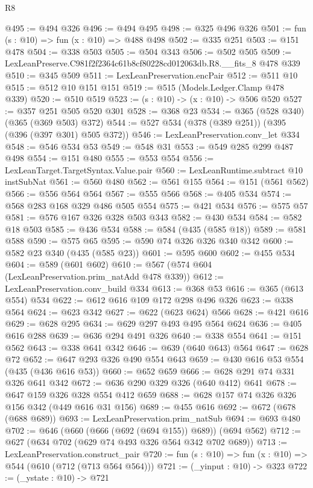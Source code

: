 \begin{lexlean}{R8}
\begin{coremodule}
@495 := @494 @326
@496 := @494 @495
@498 := @325 @496 @326
@501 := fun (s : @10) => fun (x : @10) => @488 @498
@502 := @335 @251
@503 := @151 @478
@504 := @338 @503
@505 := @504 @343
@506 := @502 @505
@509 := LexLeanPreserve.C981f2f2364c61b8cf80228cd012063db.R8.__fits_8 @478 @339
@510 := @345 @509
@511 := LexLeanPreservation.encPair
@512 := @511 @10
@515 := @512 @10 @151 @151
@519 := @515 (Models.Ledger.Clamp @478 @339)
@520 := @510 @519
@523 := (s : @10) -> (x : @10) -> @506 @520
@527 := @357 @251 @505 @520 @301
@528 := @368 @23
@534 := @365 (@528 @340) (@365 (@369 @503) @372)
@544 := @527 @534 (@378 (@389 @251)) (@395 (@396 (@397 @301) @505 @372))
@546 := LexLeanPreservation.conv_let @334
@548 := @546 @534 @53
@549 := @548 @31
@553 := @549 @285 @299 @487 @498
@554 := @151 @480
@555 := @553 @554
@556 := LexLeanTarget.TargetSyntax.Value.pair
@560 := LexLeanRuntime.subtract @10 instSubNat
@561 := @560 @480
@562 := @561 @155
@564 := @151 (@561 @562)
@566 := @556 @564 @564
@567 := @555 @566
@568 := @405 @534
@574 := @568 @283 @168 @329 @486 @505 @554
@575 := @421 @534
@576 := @575 @57
@581 := @576 @167 @326 @328 @503 @343
@582 := @430 @534
@584 := @582 @18 @503
@585 := @436 @534
@588 := @584 (@435 (@585 @18))
@589 := @581 @588
@590 := @575 @65
@595 := @590 @74 @326 @326 @340 @342
@600 := @582 @23 @340 (@435 (@585 @23))
@601 := @595 @600
@602 := @455 @534
@604 := @589 (@601 @602)
@610 := @567 (@574 @604 (LexLeanPreservation.prim_natAdd @478 @339))
@612 := LexLeanPreservation.conv_build @334
@613 := @368 @53
@616 := @365 (@613 @554) @534
@622 := @612 @616 @109 @172 @298 @496 @326
@623 := @338 @564
@624 := @623 @342
@627 := @622 (@623 @624) @566
@628 := @421 @616
@629 := @628 @295
@634 := @629 @297 @493 @495 @564 @624
@636 := @405 @616 @288
@639 := @636 @294 @491 @326
@640 := @338 @554
@641 := @151 @562
@643 := @338 @641 @342
@646 := @639 (@640 @643) @564
@647 := @628 @72
@652 := @647 @293 @326 @490 @554 @643
@659 := @430 @616 @53 @554 (@435 (@436 @616 @53))
@660 := @652 @659
@666 := @628 @291 @74 @331 @326 @641 @342
@672 := @636 @290 @329 @326 (@640 @412) @641
@678 := @647 @159 @326 @328 @554 @412 @659
@688 := @628 @157 @74 @326 @326 @156 @342 (@449 @616 @31 @156)
@689 := @455 @616
@692 := @672 (@678 (@688 @689))
@693 := LexLeanPreservation.prim_natSub
@694 := @693 @480
@702 := @646 (@660 (@666 (@692 (@694 @155)) @689)) (@694 @562)
@712 := @627 (@634 @702 (@629 @74 @493 @326 @564 @342 @702 @689))
@713 := LexLeanPreservation.construct_pair
@720 := fun (s : @10) => fun (x : @10) => @544 (@610 (@712 (@713 @564 @564)))
@721 := (_yinput : @10) -> @323
@722 := (_ystate : @10) -> @721

\end{coremodule}
\end{lexlean}
